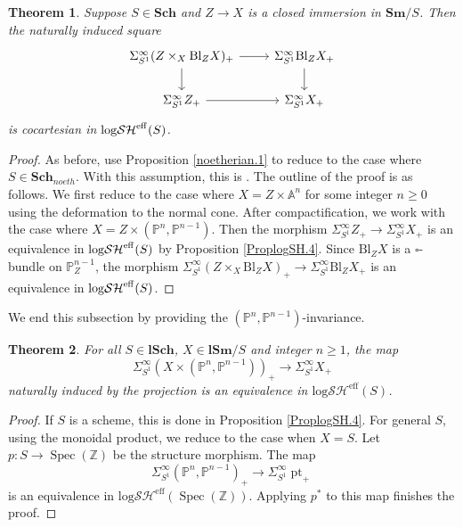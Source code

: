 \documentclass[11pt, a4paper]{amsart}
\newtheorem{thm}{Theorem}[subsection]
\theoremstyle{definition}
\numberwithin{equation}{subsection}
\newcommand{\Z}{\mathbb{Z}}
\renewcommand{\P}{\mathbb{P}}
\newcommand{\A}{\mathbb{A}}
\newcommand{\Sch}{\mathbf{Sch}}
\newcommand{\lSch}{\mathbf{lSch}}
\newcommand{\Sm}{\mathbf{Sm}}
\newcommand{\lSm}{\mathbf{lSm}}
\providecommand{\Spec}[1]{\operatorname{Spec}(#1)} 	%
\newcommand{\pt}[1]{\mathrm{\pt}_{#1}}
\newcommand{\Blow}{{\mathrm{Bl}}}
\newcommand{\boxx}{\square}
\def\pt{\operatorname{pt}}
\newcommand{\eff}{{\rm eff}}
\newcommand{\inflogSH}{\mathrm{log}\mathcal{SH}}
\newcommand{\inflogSHS}{\mathrm{log}\mathcal{SH}^{\mathrm{eff}}}
\begin{document}
\begin{thm}
\label{ProplogSH.5}
Suppose $S\in \Sch$ and $Z\to X$ is a closed immersion in $\Sm/S$. 
Then the naturally induced square
\[
\begin{tikzcd}
\Sigma_{S^1}^\infty(Z\times_X \Blow_Z X)_+\ar[d]\ar[r]&
\Sigma_{S^1}^\infty\Blow_Z X_+\ar[d]
\\
\Sigma_{S^1}^\infty Z_+\ar[r]&
\Sigma_{S^1}^\infty X_+
\end{tikzcd}
\]
is cocartesian in $\inflogSH^\eff(S)$.
\end{thm}
\begin{proof}
As before,
use Proposition \ref{noetherian.1} to reduce to the case where $S\in \Sch_{noeth}$.
With this assumption,
this is \cite[Theorem 7.3.3]{logDM}.
The outline of the proof is as follows.
We first reduce to the case where $X=Z\times \A^n$ for some integer $n\geq 0$ using the deformation to the normal cone.
After compactification,
we work with the case where $X=Z\times (\P^n,\P^{n-1})$.
Then the morphism $\Sigma_{S^1}^\infty Z_+\to \Sigma_{S^1}^\infty X_+$ is an equivalence in $\inflogSH^\eff(S)$ by Proposition \ref{ProplogSH.4}.
Since $\Blow_Z X$ is a $\boxx$-bundle on $\P_Z^{n-1}$,
the morphism $\Sigma_{S^1}^\infty(Z\times_X \Blow_Z X)_+\to \Sigma_{S^1}^\infty\Blow_Z X_+$ is an equivalence in $\inflogSH^\eff(S)$.
\end{proof}


We end this subsection by providing the $(\P^n,\P^{n-1})$-invariance.



\begin{thm}\label{thm:PnPn-1_invariance}
For all $S\in \lSch$, 
$X\in \lSm/S$ and integer $n\geq 1$, 
the map
\[
\Sigma_{S^1}^\infty (X\times (\P^n,\P^{n-1}))_+
\to
\Sigma_{S^1}^\infty X_+
\]
naturally induced by the projection is an equivalence in $\inflogSHS(S)$.
\end{thm}
\begin{proof}
If $S$ is a scheme, this is done in Proposition \ref{ProplogSH.4}.
For general $S$, using the monoidal product, we reduce to the case when $X=S$.
Let $p\colon S\to \Spec{\Z}$ be the structure morphism.
The map
\[
\Sigma_{S^1}^\infty (\P^n,\P^{n-1})_+\to  \Sigma_{S^1}^\infty \pt_+
\]
is an equivalence in $\inflogSHS(\Spec{\Z})$.
Applying $p^*$ to this map finishes the proof.
\end{proof}
\end{document}
